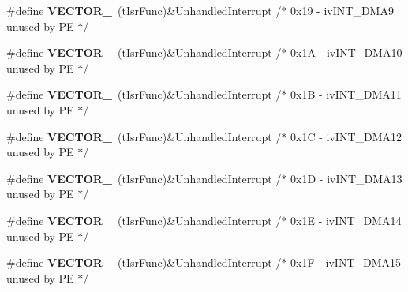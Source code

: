 \begin{DoxyCompactItemize}
\item 
\#define {\bfseries V\+E\+C\+T\+O\+R\+\_}~(t\+Isr\+Func)\&Unhandled\+Interrupt         /$\ast$ 0x19 -\/    iv\+I\+N\+T\+\_\+\+D\+M\+A9                     unused by P\+E $\ast$/\hypertarget{group___vectors___config__module_ga946786b12b40991e2f7dbcc864d860f3}{}\label{group___vectors___config__module_ga946786b12b40991e2f7dbcc864d860f3}

\item 
\#define {\bfseries V\+E\+C\+T\+O\+R\+\_}~(t\+Isr\+Func)\&Unhandled\+Interrupt         /$\ast$ 0x1\+A -\/    iv\+I\+N\+T\+\_\+\+D\+M\+A10                    unused by P\+E $\ast$/\hypertarget{group___vectors___config__module_ga79948ec9db3c5fcac1c075324c264b20}{}\label{group___vectors___config__module_ga79948ec9db3c5fcac1c075324c264b20}

\item 
\#define {\bfseries V\+E\+C\+T\+O\+R\+\_}~(t\+Isr\+Func)\&Unhandled\+Interrupt         /$\ast$ 0x1\+B -\/    iv\+I\+N\+T\+\_\+\+D\+M\+A11                    unused by P\+E $\ast$/\hypertarget{group___vectors___config__module_ga9f10a3bf1d93e41f4021c7784ac56338}{}\label{group___vectors___config__module_ga9f10a3bf1d93e41f4021c7784ac56338}

\item 
\#define {\bfseries V\+E\+C\+T\+O\+R\+\_}~(t\+Isr\+Func)\&Unhandled\+Interrupt         /$\ast$ 0x1\+C -\/    iv\+I\+N\+T\+\_\+\+D\+M\+A12                    unused by P\+E $\ast$/\hypertarget{group___vectors___config__module_ga9bc1cd45c7f503066f0fac6611d7c80a}{}\label{group___vectors___config__module_ga9bc1cd45c7f503066f0fac6611d7c80a}

\item 
\#define {\bfseries V\+E\+C\+T\+O\+R\+\_}~(t\+Isr\+Func)\&Unhandled\+Interrupt         /$\ast$ 0x1\+D -\/    iv\+I\+N\+T\+\_\+\+D\+M\+A13                    unused by P\+E $\ast$/\hypertarget{group___vectors___config__module_ga3d443bf1c5b9df62f443d81ea6352cf7}{}\label{group___vectors___config__module_ga3d443bf1c5b9df62f443d81ea6352cf7}

\item 
\#define {\bfseries V\+E\+C\+T\+O\+R\+\_}~(t\+Isr\+Func)\&Unhandled\+Interrupt         /$\ast$ 0x1\+E -\/    iv\+I\+N\+T\+\_\+\+D\+M\+A14                    unused by P\+E $\ast$/\hypertarget{group___vectors___config__module_gaa94e8ccbb4576ede1f233da44b5b9ff1}{}\label{group___vectors___config__module_gaa94e8ccbb4576ede1f233da44b5b9ff1}

\item 
\#define {\bfseries V\+E\+C\+T\+O\+R\+\_}~(t\+Isr\+Func)\&Unhandled\+Interrupt         /$\ast$ 0x1\+F -\/    iv\+I\+N\+T\+\_\+\+D\+M\+A15                    unused by P\+E $\ast$/\hypertarget{group___vectors___config__module_ga11270fc0ea1fcd79086a834ba67be1bb}{}\label{group___vectors___config__module_ga11270fc0ea1fcd79086a834ba67be1bb}


\end{DoxyCompactItemize}
